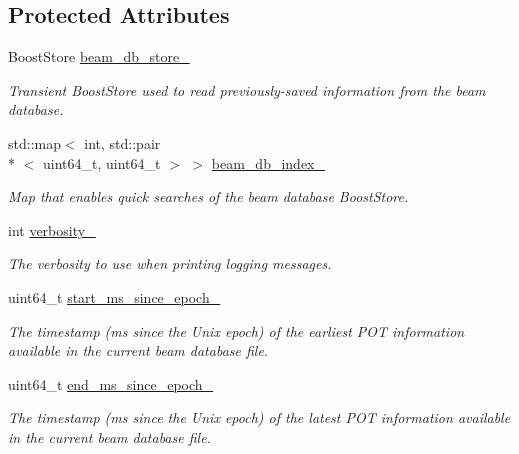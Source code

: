 \subsection*{Protected Attributes}
\begin{DoxyCompactItemize}
\item 
\hypertarget{classBeamChecker_a2b910738f1f07819ce8cf564bff685d0}{Boost\-Store \hyperlink{classBeamChecker_a2b910738f1f07819ce8cf564bff685d0}{beam\-\_\-db\-\_\-store\-\_\-}}\label{classBeamChecker_a2b910738f1f07819ce8cf564bff685d0}

\begin{DoxyCompactList}\small\item\em Transient Boost\-Store used to read previously-\/saved information from the beam database. \end{DoxyCompactList}\item 
std\-::map$<$ int, std\-::pair\\*
$<$ uint64\-\_\-t, uint64\-\_\-t $>$ $>$ \hyperlink{classBeamChecker_aab9b16fbdd8cdea6aa1a77fc2f0ea842}{beam\-\_\-db\-\_\-index\-\_\-}
\begin{DoxyCompactList}\small\item\em Map that enables quick searches of the beam database Boost\-Store. \end{DoxyCompactList}\item 
int \hyperlink{classBeamChecker_aceafb01556c2541a737d4feaab2f757e}{verbosity\-\_\-}
\begin{DoxyCompactList}\small\item\em The verbosity to use when printing logging messages. \end{DoxyCompactList}\item 
\hypertarget{classBeamChecker_acd0db6480aaf42ee431b182a68496c32}{uint64\-\_\-t \hyperlink{classBeamChecker_acd0db6480aaf42ee431b182a68496c32}{start\-\_\-ms\-\_\-since\-\_\-epoch\-\_\-}}\label{classBeamChecker_acd0db6480aaf42ee431b182a68496c32}

\begin{DoxyCompactList}\small\item\em The timestamp (ms since the Unix epoch) of the earliest P\-O\-T information available in the current beam database file. \end{DoxyCompactList}\item 
\hypertarget{classBeamChecker_abb2801b7c15da8c7ae56f96786d6cb54}{uint64\-\_\-t \hyperlink{classBeamChecker_abb2801b7c15da8c7ae56f96786d6cb54}{end\-\_\-ms\-\_\-since\-\_\-epoch\-\_\-}}\label{classBeamChecker_abb2801b7c15da8c7ae56f96786d6cb54}

\begin{DoxyCompactList}\small\item\em The timestamp (ms since the Unix epoch) of the latest P\-O\-T information available in the current beam database file. \end{DoxyCompactList}\end{DoxyCompactItemize}


